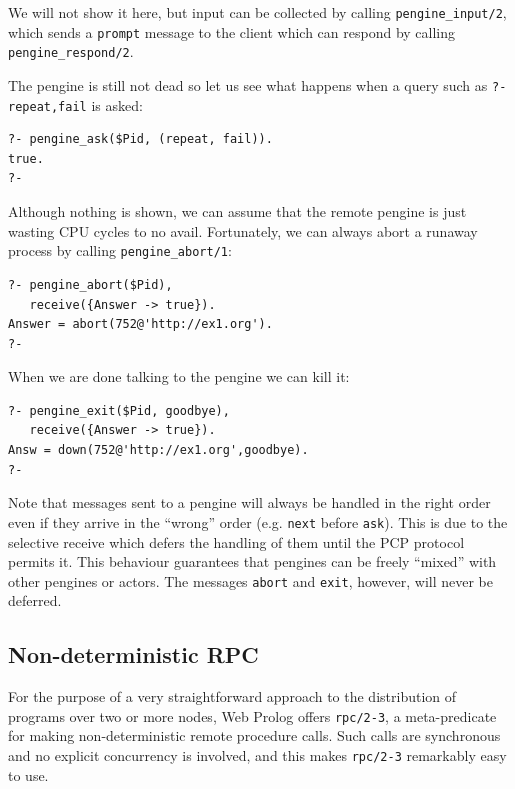 \documentclass{tlp}
\begin{document}
\noindent We will not show it here, but input can be collected by calling \texttt{pengine\_input/2}, which sends a \texttt{prompt} message to the client which can respond by calling \texttt{pengine\_respond/2}. 

The pengine is still not dead so let us see what happens when a query such as \texttt{?-repeat,fail} is asked:

\begin{lstlisting}
?- pengine_ask($Pid, (repeat, fail)).
true.
?-
\end{lstlisting}

\noindent Although nothing is shown, we can assume that the remote pengine is just wasting CPU cycles to no avail. Fortunately, we can always abort a runaway process by calling \texttt{pengine\_abort/1}:

\begin{lstlisting}
?- pengine_abort($Pid),
   receive({Answer -> true}).
Answer = abort(752@'http://ex1.org').
?-
\end{lstlisting}

\noindent When we are done talking to the pengine we can kill it:

\begin{lstlisting}
?- pengine_exit($Pid, goodbye),
   receive({Answer -> true}).
Answ = down(752@'http://ex1.org',goodbye).
?-
\end{lstlisting}

\noindent Note that messages sent to a pengine will always be handled in the right order even if they arrive in the ``wrong'' order (e.g. \texttt{next} before \texttt{ask}). This is due to the selective receive which defers the handling of them until the PCP protocol permits it. This behaviour guarantees that pengines can be freely ``mixed'' with other pengines or actors. The messages \texttt{abort} and \texttt{exit}, however, will never be deferred.


\subsection{Non-deterministic RPC}\label{sec:ndrpc} 

\noindent For the purpose of a very straightforward approach to the distribution of programs over two or more nodes, Web Prolog offers \texttt{rpc/2-3}, a meta-predicate for making non-deterministic remote procedure calls. Such calls are synchronous and no explicit concurrency is involved, and this makes \texttt{rpc/2-3} remarkably easy to use.
\end{document}
